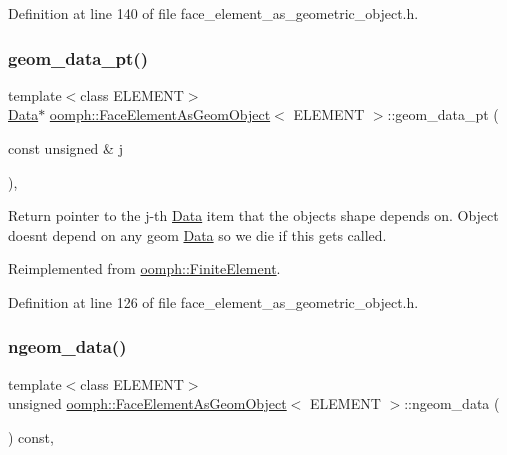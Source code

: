 Definition at line 140 of file face\+\_\+element\+\_\+as\+\_\+geometric\+\_\+object.\+h.

\mbox{\label{classoomph_1_1FaceElementAsGeomObject_ac086288f59f368278b08894a00e990fa}} 
\subsubsection{\texorpdfstring{geom\+\_\+data\+\_\+pt()}{geom\_data\_pt()}}
{\footnotesize\ttfamily template$<$class E\+L\+E\+M\+E\+NT$>$ \\
\hyperlink{classoomph_1_1Data}{Data}$\ast$ \hyperlink{classoomph_1_1FaceElementAsGeomObject}{oomph\+::\+Face\+Element\+As\+Geom\+Object}$<$ E\+L\+E\+M\+E\+NT $>$\+::geom\+\_\+data\+\_\+pt (\begin{DoxyParamCaption}\item[{const unsigned \&}]{j }\end{DoxyParamCaption})\hspace{0.3cm}{\ttfamily [inline]}, {\ttfamily [virtual]}}



Return pointer to the j-\/th \hyperlink{classoomph_1_1Data}{Data} item that the object\textquotesingle{}s shape depends on. Object doesn\textquotesingle{}t depend on any geom \hyperlink{classoomph_1_1Data}{Data} so we die if this gets called. 



Reimplemented from \hyperlink{classoomph_1_1FiniteElement_aa119a9aaad3d2ebb54ff085726c3708d}{oomph\+::\+Finite\+Element}.



Definition at line 126 of file face\+\_\+element\+\_\+as\+\_\+geometric\+\_\+object.\+h.

\mbox{\label{classoomph_1_1FaceElementAsGeomObject_aa4c65d845266c0fc60bbd0d75d2951bb}} 
\subsubsection{\texorpdfstring{ngeom\+\_\+data()}{ngeom\_data()}}
{\footnotesize\ttfamily template$<$class E\+L\+E\+M\+E\+NT$>$ \\
unsigned \hyperlink{classoomph_1_1FaceElementAsGeomObject}{oomph\+::\+Face\+Element\+As\+Geom\+Object}$<$ E\+L\+E\+M\+E\+NT $>$\+::ngeom\+\_\+data (\begin{DoxyParamCaption}{ }\end{DoxyParamCaption}) const\hspace{0.3cm}{\ttfamily [inline]}, {\ttfamily [virtual]}}



